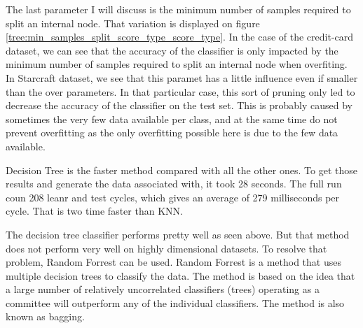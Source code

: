 \documentclass[twocolumn, a4paper, 10pt]{article}
\begin{document}
		The last parameter I will discuss is the minimum number of samples required to split an internal node. That variation is displayed on figure \ref{tree:min_samples_split_score_type_score_type}. In the case of the credit-card dataset, we can see that the accuracy of the classifier is only impacted by the minimum number of samples required to split an internal node when overfiting. In Starcraft dataset, we see that this paramet has a little influence even if smaller than the over parameters.  In that particular case, this sort of pruning only led to decrease the accuracy of the classifier on the test set. This is probably caused by sometimes the very few data available per class, and at the same time do not prevent overfitting as the only overfitting possible here is due to the few data available.

		Decision Tree is the faster method compared with all the other ones. To get those results and generate the data associated with, it took 28 seconds. The full run coun 208 leanr and test cycles, which gives an average of 279 milliseconds per cycle. That is two time faster than KNN.

		The decision tree classifier performs pretty well as seen above. But that method does not perform very well on highly dimensional datasets. To resolve that problem, Random Forrest can be used. Random Forrest is a method that uses multiple decision trees to classify the data. The method is based on the idea that a large number of relatively uncorrelated classifiers (trees) operating as a committee will outperform any of the individual classifiers. The method is also known as bagging.
\end{document}
